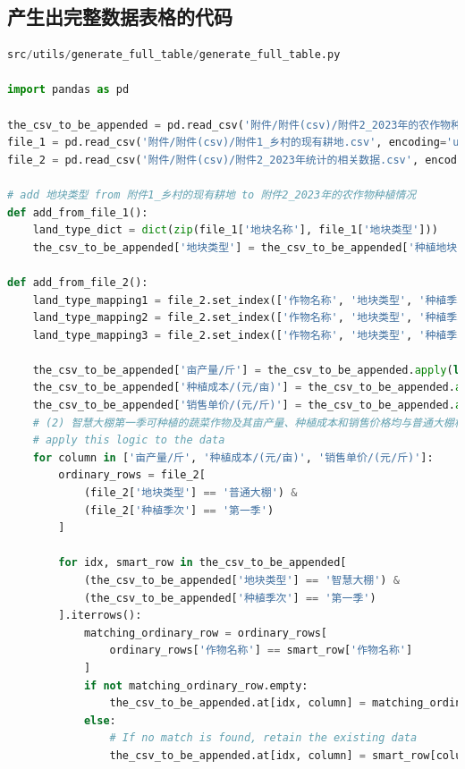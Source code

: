 \documentclass[withoutpreface]{cumcmthesis}
\begin{document}
\begin{appendices}
\begin{lstlisting}[language=python]
\end{lstlisting}

\subsection{产生出完整数据表格的代码}
\begin{lstlisting}[language=python]
src/utils/generate_full_table/generate_full_table.py

import pandas as pd

the_csv_to_be_appended = pd.read_csv('附件/附件(csv)/附件2_2023年的农作物种植情况.csv', encoding='utf-8-sig')
file_1 = pd.read_csv('附件/附件(csv)/附件1_乡村的现有耕地.csv', encoding='utf-8-sig')
file_2 = pd.read_csv('附件/附件(csv)/附件2_2023年统计的相关数据.csv', encoding='utf-8-sig')

# add 地块类型 from 附件1_乡村的现有耕地 to 附件2_2023年的农作物种植情况
def add_from_file_1():
    land_type_dict = dict(zip(file_1['地块名称'], file_1['地块类型']))
    the_csv_to_be_appended['地块类型'] = the_csv_to_be_appended['种植地块'].map(land_type_dict)

def add_from_file_2():
    land_type_mapping1 = file_2.set_index(['作物名称', '地块类型', '种植季次']).to_dict()['亩产量/斤']
    land_type_mapping2 = file_2.set_index(['作物名称', '地块类型', '种植季次']).to_dict()['种植成本/(元/亩)']
    land_type_mapping3 = file_2.set_index(['作物名称', '地块类型', '种植季次']).to_dict()['销售单价/(元/斤)']

    the_csv_to_be_appended['亩产量/斤'] = the_csv_to_be_appended.apply(lambda row: land_type_mapping1.get((row['作物名称'], row['地块类型'], row['种植季次'])), axis=1)
    the_csv_to_be_appended['种植成本/(元/亩)'] = the_csv_to_be_appended.apply(lambda row: land_type_mapping2.get((row['作物名称'], row['地块类型'], row['种植季次'])), axis=1)
    the_csv_to_be_appended['销售单价/(元/斤)'] = the_csv_to_be_appended.apply(lambda row: land_type_mapping3.get((row['作物名称'], row['地块类型'], row['种植季次'])), axis=1)
    # (2) 智慧大棚第一季可种植的蔬菜作物及其亩产量、种植成本和销售价格均与普通大棚相同，表中省略。
    # apply this logic to the data
    for column in ['亩产量/斤', '种植成本/(元/亩)', '销售单价/(元/斤)']:
        ordinary_rows = file_2[
            (file_2['地块类型'] == '普通大棚') & 
            (file_2['种植季次'] == '第一季')
        ]

        for idx, smart_row in the_csv_to_be_appended[
            (the_csv_to_be_appended['地块类型'] == '智慧大棚') & 
            (the_csv_to_be_appended['种植季次'] == '第一季')
        ].iterrows():
            matching_ordinary_row = ordinary_rows[
                ordinary_rows['作物名称'] == smart_row['作物名称']
            ]
            if not matching_ordinary_row.empty:
                the_csv_to_be_appended.at[idx, column] = matching_ordinary_row.iloc[0][column]
            else:
                # If no match is found, retain the existing data
                the_csv_to_be_appended.at[idx, column] = smart_row[column]



\end{lstlisting}
\end{appendices}
\end{document}
